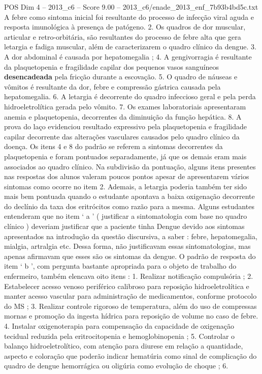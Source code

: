 \begin{textsample}{POS Dim 4 – 2013\_c6 – Score 9.00 – 2013\_c6/enade\_2013\_enf\_7b93b4bd5c.txt}
A febre como sintoma inicial foi resultante do processo de infecção viral aguda e resposta imunológica à presença de patógeno. 2.
Os quadros de dor muscular, articular e retro-orbitária, são resultantes do processo de febre alta que gera letargia e fadiga muscular, além de caracterizarem o quadro clínico da dengue. 3.
A dor abdominal é causada por hepatomegalia ; 4.
A gengivorragia é resultante da plaquetopenia e fragilidade capilar dos pequenos vasos sanguíneos \textbf{desencadeada} pela fricção durante a escovação. 5.
O quadro de náuseas e vômitos é resultante da dor, febre e compressão gástrica causada pela hepatomegalia. 6.
A letargia é decorrente do quadro infeccioso geral e pela perda hidroeletrolítica gerada pelo vômito. 7.
Os exames laboratoriais apresentaram anemia e plaquetopenia, decorrentes da diminuição da função hepática. 8.
A prova do laço evidenciou resultado expressivo pela plaquetopenia e fragilidade capilar decorrente das alterações vasculares causados pelo quadro clínico da doença.
Os itens 4 e 8 do padrão se referem a sintomas decorrentes da plaquetopenia e foram pontuados separadamente, já que os demais eram mais associados ao quadro clínico.
Na subdivisão da pontuação, alguns itens presentes nas respostas dos alunos valeram poucos pontos apesar de apresentarem vários sintomas como ocorre no item 2.
Ademais, a letargia poderia também ter sido mais bem pontuada quando o estudante apontava a baixa oxigenação decorrente do declínio da taxa dos eritrócitos como razão para a mesma.
Alguns estudantes entenderam que no item ‘ a ’ ( justificar a sintomatologia com base no quadro clínico ) deveriam justificar que a paciente tinha Dengue devido aos sintomas apresentados na introdução da questão discursiva, a saber : febre, hepatomegalia, mialgia, artralgia etc.
Dessa forma, não justificavam essas sintomatologias, mas apenas afirmavam que esses são os sintomas da dengue.
O padrão de resposta do item ‘ b ’, com pergunta bastante apropriada para o objeto de trabalho do enfermeiro, também elencava oito itens : 1.
Realizar notificação compulsória ; 2.
Estabelecer acesso venoso periférico calibroso para reposição hidroeletrolítica e manter acesso vascular para administração de medicamentos, conforme protocolo do MS ; 3.
Realizar controle rigoroso de temperatura, além do uso de compressas mornas e promoção da ingesta hídrica para reposição de volume no caso de febre. 4.
Instalar oxigenoterapia para compensação da capacidade de oxigenação tecidual reduzida pela eritrocitopenia e hemoglobinopenia ; 5.
Controlar o balanço hidroeletrolítico, com atenção para diurese em relação a quantidade, aspecto e coloração que poderão indicar hematúria como sinal de complicação do quadro de dengue hemorrágica ou oligúria como evolução de choque ; 6.

\end{textsample}
